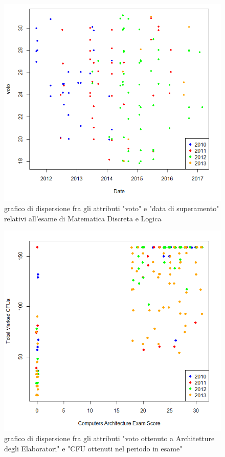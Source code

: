                 \begin{figure}
                    \centering
                    \caption{grafico di dispersione fra gli attributi "voto" e "data di superamento" relativi all'esame di Matematica Discreta e Logica}
                    \label{mdl_2}
                	\includegraphics[scale=0.6]{img/scatter_plot_9.png}
                \end{figure}

                \begin{figure}
                    \centering
                    \caption{grafico di dispersione fra gli attributi "voto ottenuto a Architetture degli Elaboratori" e "CFU ottenuti nel periodo in esame"}
                    \label{ade}
                	\includegraphics[scale=0.6]{img/scatter_plot_6.png}
                \end{figure}

